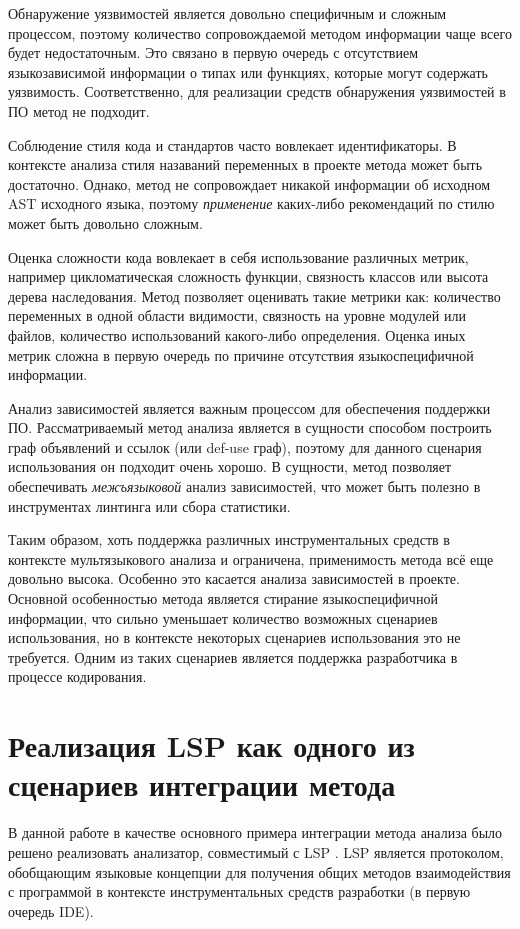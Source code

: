 Обнаружение уязвимостей является довольно специфичным и сложным процессом, поэтому
количество сопровождаемой методом информации чаще всего будет недостаточным. Это связано
в первую очередь с отсутствием языкозависимой информации о типах или функциях, которые
могут содержать уязвимость. Соответственно, для реализации средств обнаружения уязвимостей в ПО
метод не подходит.

Соблюдение стиля кода и стандартов часто вовлекает идентификаторы. В контексте
анализа стиля назаваний переменных в проекте метода может быть достаточно. Однако, метод
не сопровождает никакой информации об исходном AST исходного языка, поэтому \textit{применение}
каких-либо рекомендаций по стилю может быть довольно сложным.

Оценка сложности кода вовлекает в себя использование различных метрик, например цикломатическая сложность
функции, связность классов или высота дерева наследования. Метод позволяет оценивать такие метрики как:
количество переменных в одной области видимости, связность на уровне модулей или файлов, количество
использований какого-либо определения. Оценка иных метрик сложна в первую очередь по причине отсутствия
языкоспецифичной информации.

Анализ зависимостей является важным процессом для обеспечения поддержки ПО. Рассматриваемый
метод анализа является в сущности способом построить граф объявлений и ссылок (или def-use граф), поэтому
для данного сценария использования он подходит очень хорошо. В сущности, метод позволяет обеспечивать
\textit{межъязыковой} анализ зависимостей, что может быть полезно в инструментах линтинга или
сбора статистики.

Таким образом, хоть поддержка различных инструментальных средств в контексте мультязыкового анализа и
ограничена, применимость метода всё еще довольно высока. Особенно это касается анализа зависимостей
в проекте. Основной особенностью метода является стирание языкоспецифичной информации, что
сильно уменьшает количество возможных сценариев использования, но в контексте некоторых сценариев использования
это не требуется. Одним из таких сценариев является поддержка разработчика в процессе кодирования.

\section{Реализация LSP как одного из сценариев интеграции метода}

В данной работе в качестве основного примера интеграции метода анализа было решено реализовать
анализатор, совместимый с LSP 
 \cite{LSP-spec}. LSP является протоколом, обобщающим языковые концепции для получения общих
методов взаимодействия с программой в контексте инструментальных средств разработки (в первую очередь IDE).

